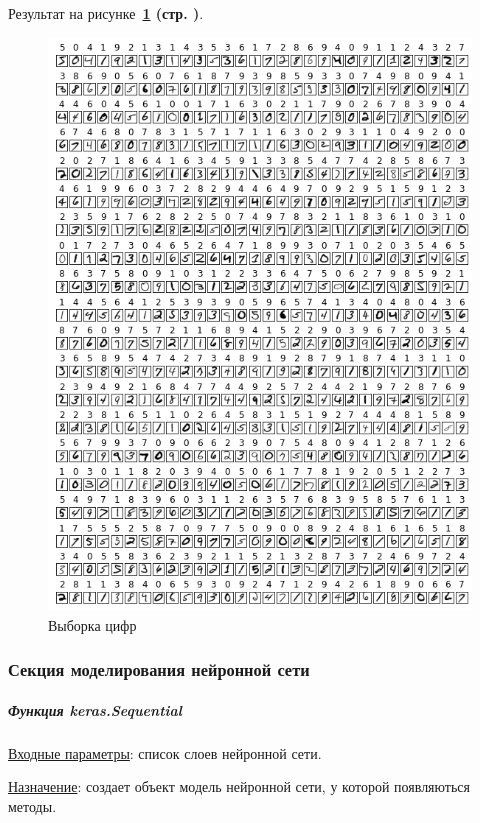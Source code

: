 Результат на рисунке~\textbf{\ref{fig:4_x_train} (стр. \pageref{fig:4_x_train})}.

\begin{figure}[!htbp]
    \centering
    \includegraphics[width=14.6cm]
    {../_INCLUDES/main/4/x_train.png}
    \caption{Выборка цифр}
    \label{fig:4_x_train}
\end{figure}



\subsubsection{Секция моделирования нейронной сети}


\subparagraph{Функция keras.Sequential} \hspace{0pt}

\underline{Входные параметры}: список слоев нейронной сети.

\underline{Назначение}: создает объект модель нейронной сети, у которой появляються методы.

